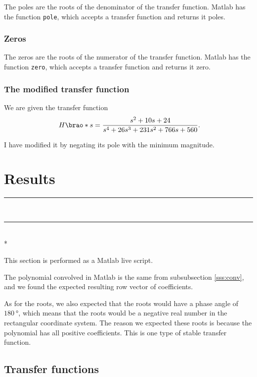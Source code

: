 \documentclass[12pt]{article}
\DeclarePairedDelimiter\brao()%
\def\hr{{\par\noindent\rule{\textwidth}{0.4pt}}}
\begin{document}
The poles are the roots of the denominator of the transfer function.
Matlab has the function \texttt{pole},
which accepts a transfer function and returns it poles.

\subsubsection{Zeros}

The zeros are the roots of the numerator of the transfer function.
Matlab has the function \texttt{zero},
which accepts a transfer function and returns it zero.

\subsubsection{The modified transfer function}

We are given the transfer function
\[
    H\brao*s = \frac{s^2 + 10s + 24}{s^4 + 26s^3 + 231s^2 + 766s + 560}\rlap.
\]

I have modified it by negating its pole with the minimum magnitude.

\section{Results}

\hr

%

\ \hr \\*

This section is performed as a Matlab live script.

The polynomial convolved in Matlab is the same from subsubsection \ref{sss:conv}, and we found the expected resulting row vector of coefficients.

As for the roots, we also expected that the roots would have a phase angle of $\SI{180}\degree$,
which means that the roots would be a negative real number in the rectangular coordinate system.
The reason we expected these roots is because the polynomial has all positive coefficients.
This is one type of stable transfer function.

\subsection{Transfer functions}
\end{document}
